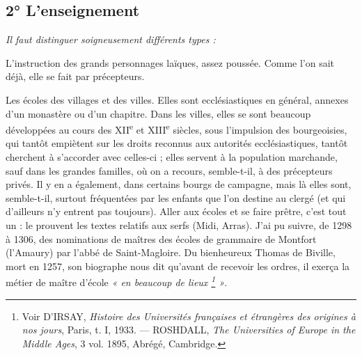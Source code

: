 \documentclass[french,twoside]{book} %
\newlength{\listmod}
\newcommand{\listhead}[1]{\hspace{-1\listmod}\emph{#1}}
\newcommand\chapterclose{} %
\renewcommand\chapterclose{} %
\begin{document}
\subsection[2° L’enseignement]{2° L’enseignement}

\begin{listalpha}[itemsep=0pt,]
\item[]\listhead{Il faut distinguer soigneusement différents types :}
\item L’instruction des grands personnages laïques, assez poussée. Comme l’on sait déjà, elle se fait par précepteurs.
\item Les écoles des villages et des villes. Elles sont ecclésiastiques en général, annexes d’un monastère ou d’un chapitre. Dans les villes, elles se sont beaucoup développées au cours des XII\textsuperscript{e} et XIII\textsuperscript{e} siècles, sous l’impulsion des bourgeoisies, qui tantôt empiètent sur les droits reconnus aux autorités ecclésiastiques, tantôt cherchent à s’accorder avec celles-ci ; elles servent à la population marchande, sauf dans les grandes familles, où on a recours, semble-t-il, à des précepteurs privés. Il y en a également, dans certains bourgs de campagne, mais là elles sont, semble-t-il, surtout fréquentées par les enfants que l’on destine au clergé (et qui d’ailleurs n’y entrent pas toujours). Aller aux écoles et se faire prêtre, c’est tout un : le prouvent les textes relatifs aux serfs (Midi, Arras). J’ai pu suivre, de 1298 à 1306, des nominations de maîtres des écoles de grammaire de Montfort (l’Amaury) par l’abbé de Saint-Magloire. Du bienheureux Thomas de Biville, mort en 1257, son biographe nous dit qu’avant de recevoir les ordres, il exerça la métier de maître d’école \emph{« en beaucoup de lieux \footnote{ Voir D’IRSAY, {\itshape Histoire des Universités françaises et étrangères des origines à nos jours}, Paris, t. I, 1933. — ROSHDALL, {\itshape The Universities of Europe in the Middle Ages}, 3 vol. 1895, Abrégé, Cambridge.} »}.

\end{listalpha}\chapterclose
\end{document}

